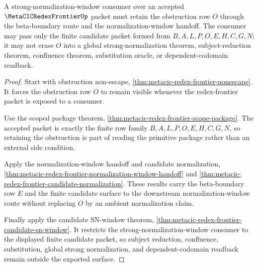 \begin{theorem}
\label{thm:metacic-redex-frontier-sn-obstruction-retention}
A strong-normalization-window consumer over an accepted
$\MetaCICRedexFrontierUp$ packet must retain the obstruction row $O$ through
the beta-boundary route and the normalization-window handoff. The consumer may
pass only the finite candidate packet formed from $B,A,L,P,O,E,H,C,G,N$; it may
not erase $O$ into a global strong-normalization theorem, subject-reduction
theorem, confluence theorem, substitution oracle, or dependent-codomain
readback.
\end{theorem}
\begin{proof}
Start with obstruction non-escape,
\autoref{thm:metacic-redex-frontier-nonescape}. It forces the obstruction row
$O$ to remain visible whenever the redex-frontier packet is exposed to a
consumer.

Use the scoped package theorem,
\autoref{thm:metacic-redex-frontier-scope-package}. The accepted packet is
exactly the finite row family $B,A,L,P,O,E,H,C,G,N$, so retaining the
obstruction is part of reading the primitive package rather than an external
side condition.

Apply the normalization-window handoff and candidate normalization,
\autoref{thm:metacic-redex-frontier-normalization-window-handoff} and
\autoref{thm:metacic-redex-frontier-candidate-normalization}. These results
carry the beta-boundary row $E$ and the finite candidate surface to the
downstream normalization-window route without replacing $O$ by an ambient
normalization claim.

Finally apply the candidate SN-window theorem,
\autoref{thm:metacic-redex-frontier-candidate-sn-window}. It restricts the
strong-normalization-window consumer to the displayed finite candidate packet,
so subject reduction, confluence, substitution, global strong normalization,
and dependent-codomain readback remain outside the exported surface.
\end{proof}

